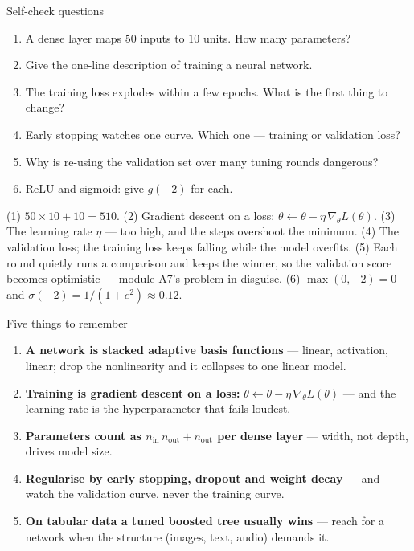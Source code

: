 \documentclass[aspectratio=169,11pt]{beamer}
\begin{document}
\begin{frame}{Self-check questions}
  \scriptsize
  \begin{readme}
    \begin{enumerate}
      \item A dense layer maps $50$ inputs to $10$ units. How many parameters?
      \item Give the one-line description of training a neural network.
      \item The training loss explodes within a few epochs. What is the first
            thing to change?
      \item Early stopping watches one curve. Which one --- training or
            validation loss?
      \item Why is re-using the validation set over many tuning rounds
            dangerous?
      \item ReLU and sigmoid: give $g(-2)$ for each.
    \end{enumerate}
  \end{readme}
  \begin{takeaway}[{{Answers}}]
    (1) $50\times 10+10=510$. (2) Gradient descent on a loss:
    $\theta\leftarrow\theta-\eta\,\nabla_\theta L(\theta)$. (3) The learning
    rate $\eta$ --- too high, and the steps overshoot the minimum. (4) The
    validation loss; the training loss keeps falling while the model overfits.
    (5) Each round quietly runs a comparison and keeps the winner, so the
    validation score becomes optimistic --- module A7's problem in disguise.
    (6) $\max(0,-2)=0$ and $\sigma(-2)=1/(1+e^{2})\approx 0.12$.
  \end{takeaway}
\end{frame}

\begin{frame}{Five things to remember}
  \begin{takeaway}
    \begin{enumerate}
      \item \textbf{A network is stacked adaptive basis functions} --- linear, activation,
            linear; drop the nonlinearity and it collapses to one linear model.
      \item \textbf{Training is gradient descent on a loss:}
            $\theta \leftarrow \theta - \eta\,\nabla_\theta L(\theta)$ --- and the learning
            rate is the hyperparameter that fails loudest.
      \item \textbf{Parameters count as $n_{\text{in}}\,n_{\text{out}} + n_{\text{out}}$
            per dense layer} --- width, not depth, drives model size.
      \item \textbf{Regularise by early stopping, dropout and weight decay} --- and watch
            the validation curve, never the training curve.
      \item \textbf{On tabular data a tuned boosted tree usually wins} --- reach for a
            network when the structure (images, text, audio) demands it.
    \end{enumerate}
  \end{takeaway}
\end{frame}
\end{document}
